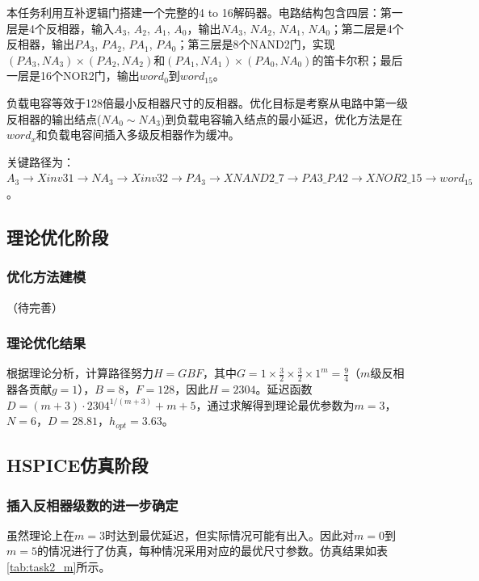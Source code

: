 \documentclass[UTF8,12pt,a4paper]{ctexart}
\begin{document}
本任务利用互补逻辑门搭建一个完整的4 to 16解码器。电路结构包含四层：第一层是4个反相器，输入$A_3$, $A_2$, $A_1$, $A_0$，输出$NA_3$, $NA_2$, $NA_1$, $NA_0$；第二层是4个反相器，输出$PA_3$, $PA_2$, $PA_1$, $PA_0$；第三层是8个NAND2门，实现$(PA_3, NA_3) \times (PA_2, NA_2)$和$(PA_1, NA_1) \times (PA_0, NA_0)$的笛卡尔积；最后一层是16个NOR2门，输出$word_0$到$word_{15}$。

负载电容等效于128倍最小反相器尺寸的反相器。优化目标是考察从电路中第一级反相器的输出结点($NA_0 \sim NA_3$)到负载电容输入结点的最小延迟，优化方法是在$word_x$和负载电容间插入多级反相器作为缓冲。

关键路径为：$A_3 \rightarrow Xinv31 \rightarrow NA_3 \rightarrow Xinv32 \rightarrow PA_3 \rightarrow XNAND2\_7 \rightarrow PA3\_PA2 \rightarrow XNOR2\_15 \rightarrow word_{15}$。

\subsection{理论优化阶段}

\subsubsection{优化方法建模}

（待完善）

\subsubsection{理论优化结果}

根据理论分析，计算路径努力$H = GBF$，其中$G = 1 \times \frac{3}{2} \times \frac{3}{2} \times 1^m = \frac{9}{4}$（$m$级反相器各贡献$g = 1$），$B = 8$，$F = 128$，因此$H = 2304$。延迟函数$D = (m+3) \cdot 2304^{1/(m+3)} + m + 5$，通过求解得到理论最优参数为$m = 3$，$N = 6$，$D = 28.81$，$h_{opt} = 3.63$。

\subsection{HSPICE仿真阶段}

\subsubsection{插入反相器级数的进一步确定}

虽然理论上在$m = 3$时达到最优延迟，但实际情况可能有出入。因此对$m = 0$到$m = 5$的情况进行了仿真，每种情况采用对应的最优尺寸参数。仿真结果如表\ref{tab:task2_m}所示。
\end{document}
